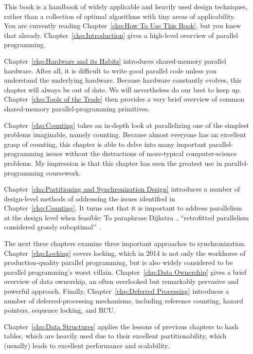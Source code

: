 This book is a handbook of widely applicable and heavily
used design techniques, rather than
a collection of optimal algorithms with tiny areas of applicability.
You are currently reading Chapter~\ref{chp:How To Use This Book}, but
you knew that already.
Chapter~\ref{chp:Introduction} gives a high-level overview of parallel
programming.

Chapter~\ref{chp:Hardware and its Habits} introduces shared-memory
parallel hardware.
After all, it is difficult to write good parallel code unless you
understand the underlying hardware.
Because hardware constantly evolves, this chapter will always be
out of date.
We will nevertheless do our best to keep up.
Chapter~\ref{chp:Tools of the Trade} then provides a very brief overview
of common shared-memory parallel-programming primitives.

Chapter~\ref{chp:Counting} takes an in-depth look at parallelizing
one of the simplest problems imaginable, namely counting.
Because almost everyone has an excellent grasp of counting, this chapter
is able to delve into many important parallel-programming issues without
the distractions of more-typical computer-science problems.
My impression is that this chapter has seen the greatest use in
parallel-programming coursework.

Chapter~\ref{cha:Partitioning and Synchronization Design}
introduces a number of design-level methods of addressing the issues
identified in Chapter~\ref{chp:Counting}.
It turns out that it is important to address parallelism at
the design level when feasible:
To paraphrase Dijkstra~\cite{Dijkstra:1968:LEG:362929.362947},
``retrofitted parallelism considered grossly
suboptimal''~\cite{PaulEMcKenney2012HOTPARsuboptimal}.

The next three chapters examine three important approaches to
synchronization.
Chapter~\ref{chp:Locking} covers locking, which in 2014 is not only the
workhorse of production-quality parallel programming, but is also widely
considered to be parallel programming's worst villain.
Chapter~\ref{chp:Data Ownership} gives a brief overview of data ownership,
an often overlooked but remarkably pervasive and powerful approach.
Finally, Chapter~\ref{chp:Deferred Processing} introduces a number of
deferred-processing mechanisms, including reference counting,
hazard pointers, sequence locking, and RCU.

Chapter~\ref{chp:Data Structures} applies the lessons of previous
chapters to hash tables, which are heavily used due
to their excellent partitionability, which (usually) leads to excellent
performance and scalability.

